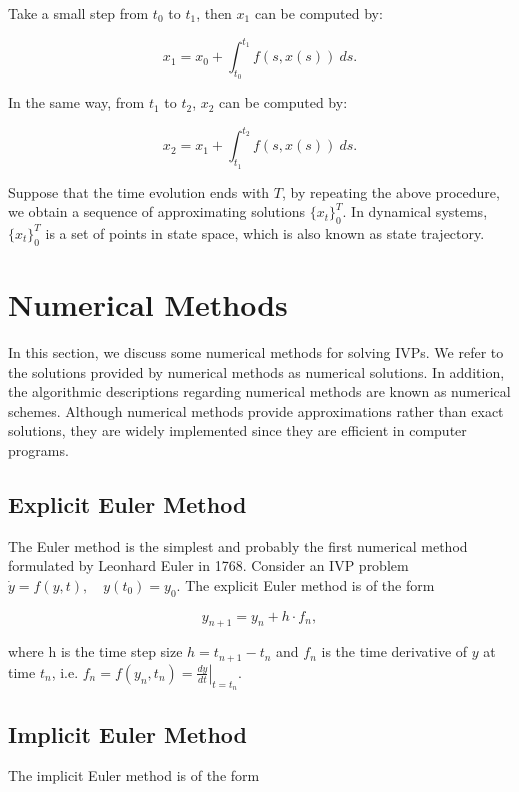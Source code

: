 \documentclass[
	parskip, 			   %
	twoside, 			   %
	DIV=14, 			   %
	BCOR=15.0mm, 		   %
	headsepline, 		   %
	open=right, 		   %
	captions=tableheading, %
	bibliography=totoc,    %
	numbers=noenddot       %
]{scrreprt}
\begin{document}
Take a small step from $t_{0}$ to $t_{1}$, then $x_{1}$ can be computed by:

\begin{equation}
    \label{eq:solution_IVP_first_step}
    x_{1} = x_{0} + \int_{t_{0}}^{t_{1}} f(s, x(s))\:ds.
\end{equation}

In the same way, from $t_{1}$ to $t_{2}$, $x_{2}$ can be computed by:

\begin{equation}
    \label{eq:solution_IVP_second_step}
    x_{2} = x_{1} + \int_{t_{1}}^{t_{2}} f(s, x(s))\:ds.
\end{equation}

Suppose that the time evolution ends with $T$, by repeating the above procedure, we obtain a sequence of approximating solutions $ \{ x_t \}_{0}^{T}$. In dynamical systems, $\{ x_t \}_{0}^{T}$ is a  set of points in state space, which is also known as state trajectory.


\clearpage
\section{Numerical Methods}
In this section, we discuss some numerical methods for solving IVPs. We refer to the solutions provided by numerical methods as numerical solutions. In addition, the algorithmic descriptions regarding numerical methods are known as numerical schemes. Although numerical methods provide approximations rather than exact solutions, they are widely implemented since they are efficient in computer programs. 

\subsection{Explicit Euler Method}
The Euler method is the simplest and probably the first numerical method formulated by Leonhard Euler in 1768. Consider an IVP problem $\dot{y} = f(y, t), \quad y(t_{0})=y_{0}$. The explicit Euler method is of the form

\begin{equation}
    \label{eq:Eulers_method_explicit}
    y_{n+1} = y_{n} + h \cdot f_{n},
\end{equation}

where h is the time step size $h = t_{n+1} - t_{n}$ and $f_{n}$ is the time derivative of $y$ at time $t_{n}$, i.e. $f_{n} = f(y_n, t_n) = \left. \frac{dy}{dt} \right|_{t=t_n}$.

\subsection{Implicit Euler Method}
The implicit Euler method is of the form
\end{document}
